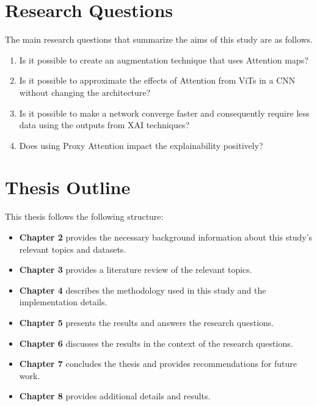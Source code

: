\section{Research Questions} \label{section:researchq}
The main research questions that summarize the aims of this study are as follows.
\begin{enumerate}
    \item Is it possible to create an augmentation technique that uses Attention maps?
    \item Is it possible to approximate the effects of Attention from ViTs in a CNN without changing the architecture?
    \item Is it possible to make a network converge faster and consequently require less data using the outputs from XAI techniques?
    \item Does using Proxy Attention impact the explainability positively?
\end{enumerate}
\section{Thesis Outline}
This thesis follows the following structure:
\begin{itemize}
    \item \textbf{Chapter 2} provides the necessary background information about this study's relevant topics and datasets.
    \item \textbf{Chapter 3} provides a literature review of the relevant topics.
    \item \textbf{Chapter 4} describes the methodology used in this study and the implementation details.
    \item \textbf{Chapter 5} presents the results and answers the research questions.
    \item \textbf{Chapter 6} discusses the results in the context of the research questions.
    \item \textbf{Chapter 7} concludes the thesis and provides recommendations for future work.
    \item \textbf{Chapter 8} provides additional details and results.
\end{itemize}